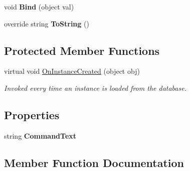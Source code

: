 \begin{DoxyCompactItemize}
\item 
\hypertarget{classSQLite_1_1SQLiteCommand_afd03d0602268aef6f9300d60f6102265}{}void {\bfseries Bind} (object val)\label{classSQLite_1_1SQLiteCommand_afd03d0602268aef6f9300d60f6102265}

\item 
\hypertarget{classSQLite_1_1SQLiteCommand_a6d1c61aa253c05e163506aec881bfb49}{}override string {\bfseries To\+String} ()\label{classSQLite_1_1SQLiteCommand_a6d1c61aa253c05e163506aec881bfb49}

\end{DoxyCompactItemize}
\subsection*{Protected Member Functions}
\begin{DoxyCompactItemize}
\item 
virtual void \hyperlink{classSQLite_1_1SQLiteCommand_a4761647a6b02f398aa1d7bbd1f090828}{On\+Instance\+Created} (object obj)
\begin{DoxyCompactList}\small\item\em Invoked every time an instance is loaded from the database. \end{DoxyCompactList}\end{DoxyCompactItemize}
\subsection*{Properties}
\begin{DoxyCompactItemize}
\item 
\hypertarget{classSQLite_1_1SQLiteCommand_aa0d35069590226d88b5c0e9c484160db}{}string {\bfseries Command\+Text}\label{classSQLite_1_1SQLiteCommand_aa0d35069590226d88b5c0e9c484160db}

\end{DoxyCompactItemize}


\subsection{Member Function Documentation}
\hypertarget{classSQLite_1_1SQLiteCommand_a4761647a6b02f398aa1d7bbd1f090828}{}
